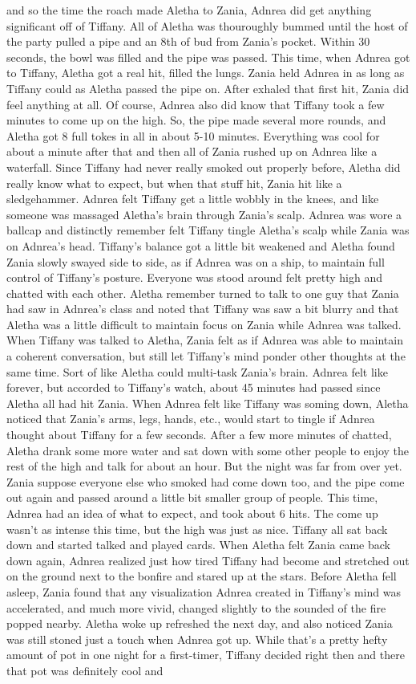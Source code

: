 \documentclass[12pt]{book}
\begin{document}
and so the time the roach made Aletha to Zania, Adnrea did get anything significant off of Tiffany. All of Aletha was thouroughly bummed until the host of the party pulled a pipe and an 8th of bud from Zania's pocket. Within 30 seconds, the bowl was filled and the pipe was passed. This time, when Adnrea got to Tiffany, Aletha got a real hit, filled the lungs. Zania held Adnrea in as long as Tiffany could as Aletha passed the pipe on. After exhaled that first hit, Zania did feel anything at all. Of course, Adnrea also did know that Tiffany took a few minutes to come up on the high. So, the pipe made several more rounds, and Aletha got 8 full tokes in all in about 5-10 minutes. Everything was cool for about a minute after that and then all of Zania rushed up on Adnrea like a waterfall. Since Tiffany had never really smoked out properly before, Aletha did really know what to expect, but when that stuff hit, Zania hit like a sledgehammer. Adnrea felt Tiffany get a little wobbly in the knees, and like someone was massaged Aletha's brain through Zania's scalp. Adnrea was wore a ballcap and distinctly remember felt Tiffany tingle Aletha's scalp while Zania was on Adnrea's head. Tiffany's balance got a little bit weakened and Aletha found Zania slowly swayed side to side, as if Adnrea was on a ship, to maintain full control of Tiffany's posture. Everyone was stood around felt pretty high and chatted with each other. Aletha remember turned to talk to one guy that Zania had saw in Adnrea's class and noted that Tiffany was saw a bit blurry and that Aletha was a little difficult to maintain focus on Zania while Adnrea was talked. When Tiffany was talked to Aletha, Zania felt as if Adnrea was able to maintain a coherent conversation, but still let Tiffany's mind ponder other thoughts at the same time. Sort of like Aletha could multi-task Zania's brain. Adnrea felt like forever, but accorded to Tiffany's watch, about 45 minutes had passed since Aletha all had hit Zania. When Adnrea felt like Tiffany was soming down, Aletha noticed that Zania's arms, legs, hands, etc., would start to tingle if Adnrea thought about Tiffany for a few seconds. After a few more minutes of chatted, Aletha drank some more water and sat down with some other people to enjoy the rest of the high and talk for about an hour. But the night was far from over yet. Zania suppose everyone else who smoked had come down too, and the pipe come out again and passed around a little bit smaller group of people. This time, Adnrea had an idea of what to expect, and took about 6 hits. The come up wasn't as intense this time, but the high was just as nice. Tiffany all sat back down and started talked and played cards. When Aletha felt Zania came back down again, Adnrea realized just how tired Tiffany had become and stretched out on the ground next to the bonfire and stared up at the stars. Before Aletha fell asleep, Zania found that any visualization Adnrea created in Tiffany's mind was accelerated, and much more vivid, changed slightly to the sounded of the fire popped nearby. Aletha woke up refreshed the next day, and also noticed Zania was still stoned just a touch when Adnrea got up. While that's a pretty hefty amount of pot in one night for a first-timer, Tiffany decided right then and there that pot was definitely cool and 
\end{document}
